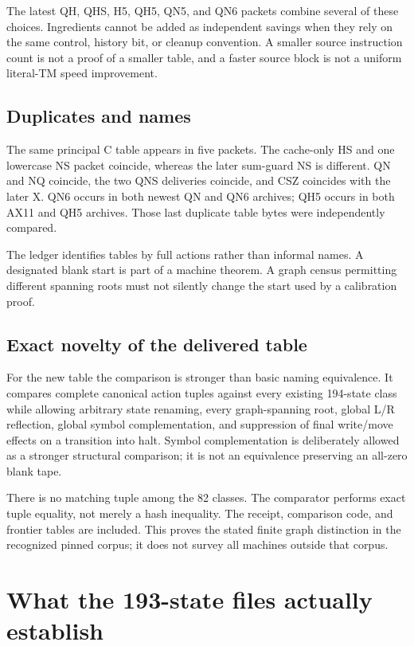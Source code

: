 \documentclass[10pt,letterpaper]{article}
\begin{document}
The latest QH, QHS, H5, QH5, QN5, and QN6 packets combine several of these
choices. Ingredients cannot be added as independent savings when
they rely on the same control, history bit, or cleanup convention.
A smaller source instruction count is not a proof of a smaller table,
and a faster source block is not a uniform literal-TM speed improvement.

\subsection{Duplicates and names}

The same principal C table appears in five packets. The cache-only
HS and one lowercase NS packet coincide, whereas the later sum-guard NS
is different. QN and NQ coincide, the two QNS deliveries coincide,
and CSZ coincides with the later X. QN6 occurs in both newest QN and QN6
archives; QH5 occurs in both AX11 and QH5 archives. Those last duplicate
table bytes were independently compared.

The ledger identifies tables by full actions rather than informal
names. A designated blank start is part of a machine theorem. A graph
census permitting different spanning roots must not silently change the
start used by a calibration proof.

\subsection{Exact novelty of the delivered table}

For the new table the comparison is stronger than basic naming
equivalence. It compares complete canonical action tuples against every
existing 194-state class while allowing arbitrary state renaming, every
graph-spanning root, global L/R reflection, global symbol complementation,
and suppression of final write/move effects on a transition into halt.
Symbol complementation is deliberately allowed as a stronger structural
comparison; it is not an equivalence preserving an all-zero blank tape.

There is no matching tuple among the 82 classes. The comparator performs
exact tuple equality, not merely a hash inequality. The receipt,
comparison code, and frontier tables are included. This proves the
stated finite graph distinction in the recognized pinned corpus; it
does not survey all machines outside that corpus.

\section{What the 193-state files actually establish}
\label{sec:193}
\end{document}
